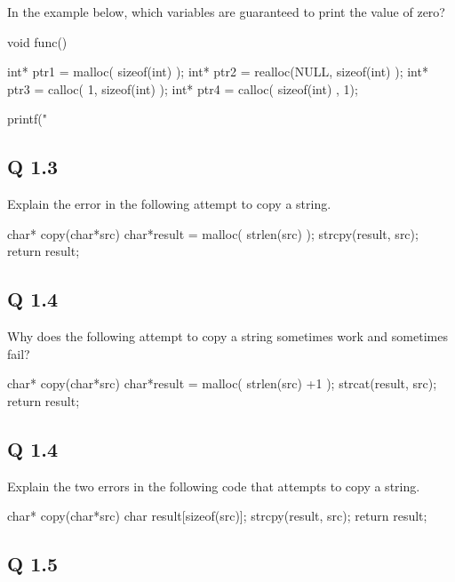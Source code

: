 In the example below, which variables are guaranteed to print the value of zero?

\begin{code}[language=C]
void func() {
   int* ptr1 = malloc( sizeof(int) );
   int* ptr2 = realloc(NULL, sizeof(int) );
   int* ptr3 = calloc( 1, sizeof(int) );
   int* ptr4 = calloc( sizeof(int) , 1);
   
   printf("%
}
\end{code}

\subsection{Q 1.3}\label{q-1.3}

Explain the error in the following attempt to copy a string.

\begin{code}[language=C]
char* copy(char*src) {
 char*result = malloc( strlen(src) ); 
 strcpy(result, src); 
 return result;
}
\end{code}

\subsection{Q 1.4}\label{q-1.4}

Why does the following attempt to copy a string sometimes work and sometimes fail?

\begin{code}[language=C]
char* copy(char*src) {
 char*result = malloc( strlen(src) +1 ); 
 strcat(result, src); 
 return result;
}
\end{code}

\subsection{Q 1.4}\label{q-1.4-1}

Explain the two errors in the following code that attempts to copy a string.

\begin{code}[language=C]
char* copy(char*src) {
 char result[sizeof(src)]; 
 strcpy(result, src); 
 return result;
}
\end{code}

\subsection{Q 1.5}\label{q-1.5}

